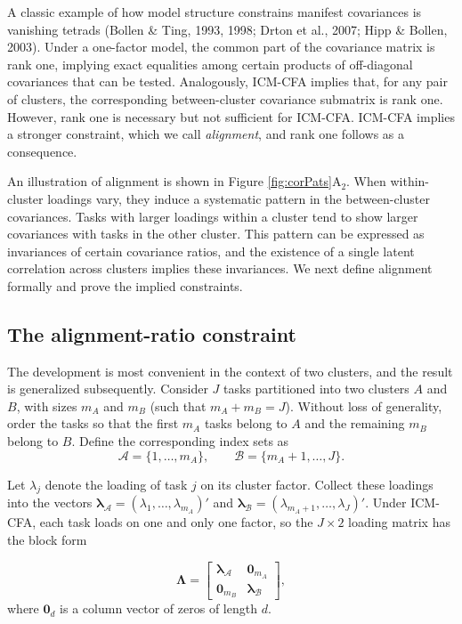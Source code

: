 \documentclass[
  american,
  man,floatsintext]{apa7}
\begin{document}
A classic example of how model structure constrains manifest covariances is vanishing tetrads (Bollen \& Ting, 1993, 1998; Drton et al., 2007; Hipp \& Bollen, 2003). Under a one-factor model, the common part of the covariance matrix is rank one, implying exact equalities among certain products of off-diagonal covariances that can be tested. Analogously, ICM-CFA implies that, for any pair of clusters, the corresponding between-cluster covariance submatrix is rank one. However, rank one is necessary but not sufficient for ICM-CFA. ICM-CFA implies a stronger constraint, which we call \emph{alignment}, and rank one follows as a consequence.

An illustration of alignment is shown in Figure \ref{fig:corPats}A\(_2\). When within-cluster loadings vary, they induce a systematic pattern in the between-cluster covariances. Tasks with larger loadings within a cluster tend to show larger covariances with tasks in the other cluster. This pattern can be expressed as invariances of certain covariance ratios, and the existence of a single latent correlation across clusters implies these invariances. We next define alignment formally and prove the implied constraints.

\subsection{The alignment-ratio constraint}\label{the-alignment-ratio-constraint}

The development is most convenient in the context of two clusters, and the result is generalized subsequently. Consider \(J\) tasks partitioned into two clusters \(A\) and \(B\), with sizes \(m_A\) and \(m_B\) (such that \(m_A+m_B=J\)). Without loss of generality, order the tasks so that the first \(m_A\) tasks belong to \(A\) and the remaining \(m_B\) belong to \(B\). Define the corresponding index sets as
\[
\mathcal A=\{1,\ldots,m_A\},
\qquad
\mathcal B=\{m_A+1,\ldots,J\}.
\]

Let \(\lambda_j\) denote the loading of task \(j\) on its cluster factor. Collect these loadings into the vectors \(\pmb\lambda_{\mathcal A}=(\lambda_{1},\ldots,\lambda_{m_A})'\) and \(\pmb\lambda_{\mathcal B}=(\lambda_{m_A+1},\ldots,\lambda_{J})'\). Under ICM-CFA, each task loads on one and only one factor, so the \(J \times 2\) loading matrix has the block form

\begin{equation} \label{loadingMatrix}
\pmb\Lambda=
\begin{bmatrix}
\pmb\lambda_{\mathcal A}&\pmb 0_{m_A}\\
\pmb 0_{m_B}&\pmb\lambda_{\mathcal B}
\end{bmatrix},
\end{equation}
where \(\pmb 0_d\) is a column vector of zeros of length \(d\).
\end{document}
